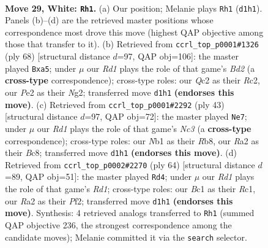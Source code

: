 \documentclass[11pt]{article}
\begin{document}
\clearpage

\begin{figure}[p]\centering
\begin{subfigure}{0.46\textwidth}\centering
\resizebox{\linewidth}{!}{%
\newchessgame
\chessboard[
  setfen={1rb2rk1/p2n3p/5b2/2pq4/Pp1p1P2/1P4N1/R1Q1PK2/1NBR4 w - - 4 29},
  showmover=false,
  pgfstyle=straightmove, color=movearrow, markmove={d1-h1}
]}
\caption{}
\end{subfigure}\hfill
\begin{subfigure}{0.46\textwidth}\centering
\resizebox{\linewidth}{!}{%
\newchessgame
\chessboard[
  setfen={2r1r1k1/4n1pp/3bqp2/p1pp4/P7/1P1QPPP1/2RB2NP/2R3K1 w - - 0 35},
  showmover=false,
  pgfstyle=straightmove, color=movearrow, markmove={d2-a5}
]}
\caption{}
\end{subfigure}
\\[4pt]
\begin{subfigure}{0.46\textwidth}\centering
\resizebox{\linewidth}{!}{%
\newchessgame
\chessboard[
  setfen={1rbr2k1/2q3pp/p1n1p3/1p6/3PpPN1/1PP5/PB2QR1P/3R2K1 b - - 0 22},
  showmover=false,
  pgfstyle=straightmove, color=movearrow, markmove={c6-e7}
]}
\caption{}
\end{subfigure}\hfill
\begin{subfigure}{0.46\textwidth}\centering
\resizebox{\linewidth}{!}{%
\newchessgame
\chessboard[
  setfen={r3r1k1/1pqb1pp1/p4n1p/8/1PP1p1P1/P3Q2P/5PN1/2RR1BK1 w - - 1 33},
  showmover=false,
  pgfstyle=straightmove, color=movearrow, markmove={d1-d4}
]}
\caption{}
\end{subfigure}
\caption{\textbf{Move 29, White: \texttt{Rh1}.} (a) Our position; Melanie plays \texttt{Rh1} (\texttt{d1h1}). Panels (b)--(d) are the retrieved master positions whose correspondence most drove this move (highest QAP objective among those that transfer to it). (b) Retrieved from \texttt{ccrl\_top\_p0001\#1326} (ply 68) [structural distance $d$=97, QAP obj=106]: the master played \texttt{Bxa5}; under $\mu$ our \emph{Rd1} plays the role of that game's \emph{Bd2} (a \textbf{cross-type} correspondence); cross-type roles: our \emph{Q}c2 as their \emph{R}c2, our \emph{P}e2 as their \emph{N}g2; transferred move \texttt{d1h1} \textbf{(endorses this move)}. (c) Retrieved from \texttt{ccrl\_top\_p0001\#2292} (ply 43) [structural distance $d$=97, QAP obj=72]: the master played \texttt{Ne7}; under $\mu$ our \emph{Rd1} plays the role of that game's \emph{Nc3} (a \textbf{cross-type} correspondence); cross-type roles: our \emph{N}b1 as their \emph{R}b8, our \emph{R}a2 as their \emph{B}c8; transferred move \texttt{d1h1} \textbf{(endorses this move)}. (d) Retrieved from \texttt{ccrl\_top\_p0002\#2270} (ply 64) [structural distance $d$=89, QAP obj=51]: the master played \texttt{Rd4}; under $\mu$ our \emph{Rd1} plays the role of that game's \emph{Rd1}; cross-type roles: our \emph{B}c1 as their \emph{R}c1, our \emph{R}a2 as their \emph{P}f2; transferred move \texttt{d1h1} \textbf{(endorses this move)}. Synthesis: 4 retrieved analogs transferred to \texttt{Rh1} (summed QAP objective 236, the strongest correspondence among the candidate moves); Melanie committed it via the \texttt{search} selector.}
\label{fig:thought-m56}
\end{figure}
\end{document}
